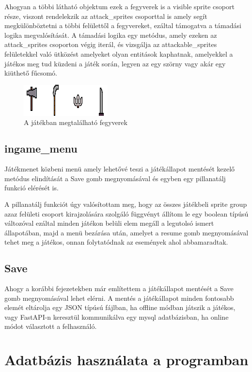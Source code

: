Ahogyan a többi látható objektum ezek a fegyverek is a visible sprite csoport része, viszont rendelekzik az attack\_sprites csoporttal is amely segít megkülönböztetni a többi felülettől a fegyvereket, ezáltal támogatva a támadási logika megvalósítását. A támadási logika egy metódus, amely ezeken az attack\_sprites csoporton végig iterál, és vizsgálja az attackable\_sprites felületekkel való ütközést amelyeket olyan entitások kaphatnak, amelyekkel a játékos meg tud küzdeni a játék során, legyen az egy szörny vagy akár egy kiüthető fűcsomó.  

\begin{figure}[H]
    \centering
    \includegraphics[width=15.5truecm]{images/weapons.png}
    \caption{A játékban megtalálható fegyverek}
    \label{fig:A játékban megtalálható fegyverek}
\end{figure}


\subsection{ingame\_menu}

Játékmenet közbeni menü amely lehetővé teszi a játékállapot mentését kezelő metódus elindítását a Save gomb megnyomásával és egyben egy pillanatálj funkció elérését is. 

A pillanatálj funkciót úgy valósítottam meg, hogy az összes játékbeli sprite group azaz felületi csoport kirajzolására szolgáló függvényt állítom le egy boolean típúsú változóval ezáltal minden játékon belüli elem megáll a legutolsó ismert állapotában, majd a menü bezárása után, amelyet a resume gomb megnyomásával tehet meg a játékos, onnan folytatódnak az események ahol abbamaradtak.

\subsection{Save}

Ahogy a korábbi fejezetekben már említettem a játékállapot mentését a Save gomb megnyomásával lehet elérni. A mentés a játékállapot minden fontosabb elemét eltárolja egy JSON típúsú fájlban, ha offline módban játszik a játékos, vagy FastAPI-n keresztül kommunikálva egy mysql adatbázisban, ha online módot választott a felhasználó.


\section{Adatbázis használata a programban}

